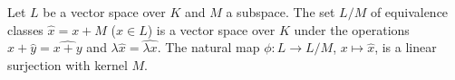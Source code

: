 Let $L$ be a vector space over $K$ and $M$ a subspace. The set $L/M$ of equivalence classes $\hat{x} = x + M$ ($x \in L$) is a vector space over $K$ under the operations $\hat{x} + \hat{y} = \widehat{x + y}$ and $\lambda \hat{x} = \widehat{\lambda x}$. The natural map $\phi: L \to L/M$, $x \mapsto \hat{x}$, is a linear surjection with kernel $M$.
